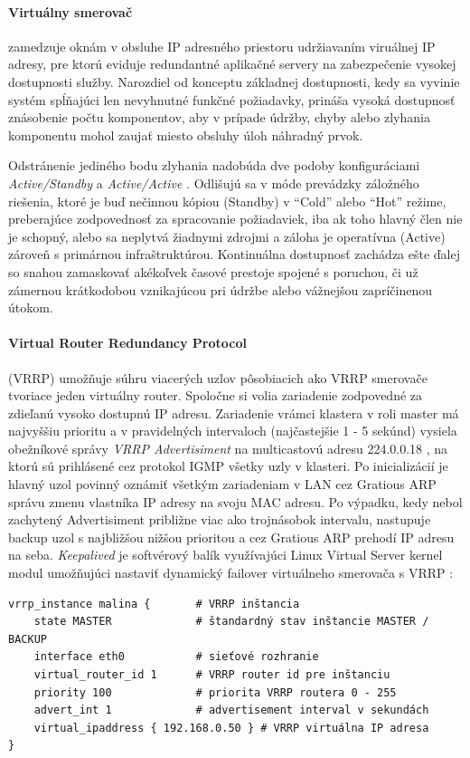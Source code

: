 \documentclass[12pt, a4paper]{article}
\begin{document}
\paragraph{Virtuálny smerovač} zamedzuje oknám v obsluhe IP adresného priestoru udržiavaním viruálnej 
IP adresy, pre ktorú eviduje redundantné aplikačné servery na zabezpečenie vysokej dostupnosti služby. 
Narozdiel od konceptu základnej dostupnosti, kedy sa vyvinie systém spĺňajúci len nevyhnutné funkčné 
požiadavky, prináša vysoká dostupnosť znásobenie počtu komponentov, aby v prípade údržby, chyby alebo 
zlyhania komponentu mohol zaujať miesto obsluhy úloh náhradný prvok. 

Odstránenie jediného bodu zlyhania nadobúda dve podoby konfiguráciami \emph{Active/Standby} a
\emph{Active/Active} \cite{availability}. Odlišujú sa v móde prevádzky záložného riešenia, 
ktoré je buď nečinnou kópiou (Standby) v \enquote{Cold} alebo \enquote{Hot} režime, preberajúce 
zodpovednosť za spracovanie požiadaviek, iba ak toho hlavný člen nie je schopný, alebo 
sa neplytvá žiadnymi zdrojmi a záloha je operatívna (Active) zároveň s primárnou infraštruktúrou. 
Kontinuálna dostupnosť zachádza ešte ďalej so snahou zamaskovať akékoľvek časové prestoje spojené s 
poruchou, či už zámernou krátkodobou vznikajúcou pri údržbe alebo vážnejšou zapríčinenou útokom.

\paragraph{Virtual Router Redundancy Protocol} (VRRP) umožňuje súhru viacerých uzlov pôsobiacich ako VRRP 
smerovače tvoriace jeden virtuálny router. Spoločne si volia zariadenie zodpovedné za zdieľanú vysoko 
dostupnú IP adresu. Zariadenie vrámci klastera v roli master má najvyššiu prioritu a v pravidelných 
intervaloch (najčastejšie 1 - 5 sekúnd) vysiela obežníkové správy \emph{VRRP Advertisiment} na multicastovú 
adresu 224.0.0.18 \cite{RFC2338}, na ktorú sú prihlásené cez protokol IGMP všetky uzly v klasteri. Po 
inicializácií je hlavný uzol povinný oznámiť všetkým zariadeniam v LAN cez Gratious ARP správu zmenu 
vlastníka IP adresy na svoju MAC adresu. Po výpadku, kedy nebol zachytený Advertisiment približne viac ako 
trojnásobok intervalu, nastupuje backup uzol s najbližšou nižšou prioritou a cez Gratious ARP prehodí IP 
adresu na seba. \emph{Keepalived} je softvérový balík využívajúci Linux Virtual Server kernel modul
umožňujúci nastaviť dynamický failover virtuálneho smerovača s VRRP \cite{keepalived-docs}:
\begin{lstlisting}
vrrp_instance malina {       # VRRP inštancia
    state MASTER             # štandardný stav inštancie MASTER / BACKUP
    interface eth0           # sieťové rozhranie
    virtual_router_id 1      # VRRP router id pre inštanciu
    priority 100             # priorita VRRP routera 0 - 255
    advert_int 1             # advertisement interval v sekundách
    virtual_ipaddress { 192.168.0.50 } # VRRP virtuálna IP adresa
}
\end{lstlisting}
\end{document}
